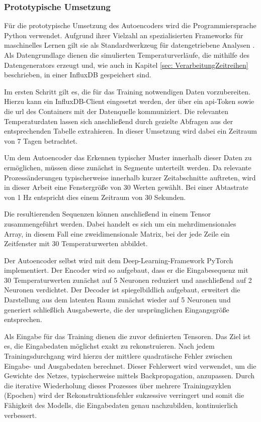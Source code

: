 \subsubsection{Prototypische Umsetzung}
Für die prototypische Umsetzung des Autoencoders wird die Programmiersprache Python verwendet. 
Aufgrund ihrer Vielzahl an spezialisierten Frameworks für maschinelles Lernen gilt sie als Standardwerkzeug für datengetriebene Analysen \cite{Python}.
Als Datengrundlage dienen die simulierten Temperaturverläufe, die mithilfe des Datengenerators erzeugt und, wie auch in Kapitel \ref{sec: VerarbeitungZeitreihen} beschrieben, in einer InfluxDB gespeichert sind.

Im ersten Schritt gilt es, die für das Training notwendigen Daten vorzubereiten. 
Hierzu kann ein InfluxDB-Client eingesetzt werden, der über ein \acs{api}-Token sowie die \acs{url} des Containers mit der Datenquelle kommuniziert.
Die relevanten Temperaturdaten lassen sich anschließend durch gezielte Abfragen aus der entsprechenden Tabelle extrahieren.
In dieser Umsetzung wird dabei ein Zeitraum von 7 Tagen betrachtet.

Um dem Autoencoder das Erkennen typischer Muster innerhalb dieser Daten zu ermöglichen, müssen diese zunächst in Segmente unterteilt werden.
Da relevante Prozessänderungen typischerweise innerhalb kurzer Zeitabschnitte auftreten, wird in dieser Arbeit eine Fenstergröße von 30 Werten gewählt. 
Bei einer Abtastrate von 1 Hz entspricht dies einem Zeitraum von 30 Sekunden.

Die resultierenden Sequenzen können anschließend in einem Tensor zusammengeführt werden.
Dabei handelt es sich um ein mehrdimensionales Array, in diesem Fall eine zweidimensionale Matrix, bei der jede Zeile ein Zeitfenster mit 30 Temperaturwerten abbildet.

Der Autoencoder selbst wird mit dem Deep-Learning-Framework PyTorch \cite{PyTorch} implementiert. 
Der Encoder wird so aufgebaut, dass er die Eingabesequenz mit 30 Temperaturwerten zunächst auf 5 Neuronen reduziert und anschließend auf 2 Neuronen verdichtet. 
Der Decoder ist spiegelbildlich aufgebaut, erweitert die Darstellung aus dem latenten Raum zunächst wieder auf 5 Neuronen und generiert schließlich Ausgabewerte, die der ursprünglichen Eingangsgröße entsprechen.

Als Eingabe für das Training dienen die zuvor definierten Tensoren.
Das Ziel ist es, die Eingabedaten möglichst exakt zu rekonstruieren.
Nach jedem Trainingsdurchgang wird hierzu der mittlere quadratische Fehler zwischen Eingabe- und Ausgabedaten berechnet.
Dieser Fehlerwert wird verwendet, um die Gewichte des Netzes, typischerweise mittels Backpropagation, anzupassen.
Durch die iterative Wiederholung dieses Prozesses über mehrere Trainingszyklen (Epochen) wird der Rekonstruktionsfehler sukzessive verringert und somit die Fähigkeit des Modells, die Eingabedaten genau nachzubilden, kontinuierlich verbessert.

